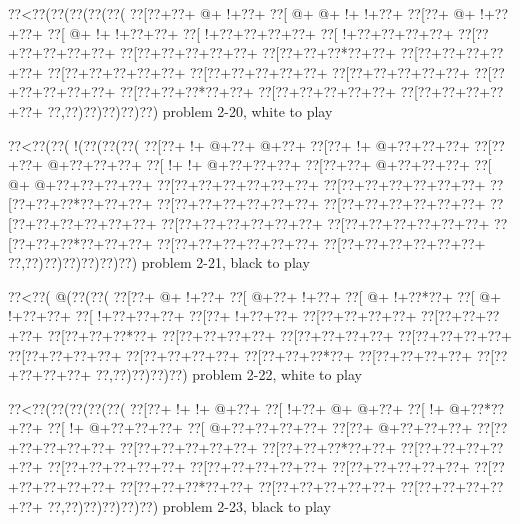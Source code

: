 \vbox{\vbox{\goo
\0??<\0??(\0??(\0??(\0??(\0??(
\0??[\0??+\0??+\- @+\- !+\0??+
\0??[\- @+\- @+\- !+\- !+\0??+
\0??[\0??+\- @+\- !+\0??+\0??+
\0??[\- @+\- !+\- !+\0??+\0??+
\0??[\- !+\0??+\0??+\0??+\0??+
\0??[\- !+\0??+\0??+\0??+\0??+
\0??[\0??+\0??+\0??+\0??+\0??+
\0??[\0??+\0??+\0??+\0??+\0??+
\0??[\0??+\0??+\0??*\0??+\0??+
\0??[\0??+\0??+\0??+\0??+\0??+
\0??[\0??+\0??+\0??+\0??+\0??+
\0??[\0??+\0??+\0??+\0??+\0??+
\0??[\0??+\0??+\0??+\0??+\0??+
\0??[\0??+\0??+\0??+\0??+\0??+
\0??[\0??+\0??+\0??*\0??+\0??+
\0??[\0??+\0??+\0??+\0??+\0??+
\0??[\0??+\0??+\0??+\0??+\0??+
\0??,\0??)\0??)\0??)\0??)\0??)
}
\hfil problem 2-20, white to play\hfil\break
}

\vbox{\vbox{\goo
\0??<\0??(\0??(\- !(\0??(\0??(\0??(
\0??[\0??+\- !+\- @+\0??+\- @+\0??+
\0??[\0??+\- !+\- @+\0??+\0??+\0??+
\0??[\0??+\0??+\- @+\0??+\0??+\0??+
\0??[\- !+\- !+\- @+\0??+\0??+\0??+
\0??[\0??+\0??+\- @+\0??+\0??+\0??+
\0??[\- @+\- @+\0??+\0??+\0??+\0??+
\0??[\0??+\0??+\0??+\0??+\0??+\0??+
\0??[\0??+\0??+\0??+\0??+\0??+\0??+
\0??[\0??+\0??+\0??*\0??+\0??+\0??+
\0??[\0??+\0??+\0??+\0??+\0??+\0??+
\0??[\0??+\0??+\0??+\0??+\0??+\0??+
\0??[\0??+\0??+\0??+\0??+\0??+\0??+
\0??[\0??+\0??+\0??+\0??+\0??+\0??+
\0??[\0??+\0??+\0??+\0??+\0??+\0??+
\0??[\0??+\0??+\0??*\0??+\0??+\0??+
\0??[\0??+\0??+\0??+\0??+\0??+\0??+
\0??[\0??+\0??+\0??+\0??+\0??+\0??+
\0??,\0??)\0??)\0??)\0??)\0??)\0??)
}
\hfil problem 2-21, black to play\hfil\break
}

\vbox{\vbox{\goo
\0??<\0??(\- @(\0??(\0??(
\0??[\0??+\- @+\- !+\0??+
\0??[\- @+\0??+\- !+\0??+
\0??[\- @+\- !+\0??*\0??+
\0??[\- @+\- !+\0??+\0??+
\0??[\- !+\0??+\0??+\0??+
\0??[\0??+\- !+\0??+\0??+
\0??[\0??+\0??+\0??+\0??+
\0??[\0??+\0??+\0??+\0??+
\0??[\0??+\0??+\0??*\0??+
\0??[\0??+\0??+\0??+\0??+
\0??[\0??+\0??+\0??+\0??+
\0??[\0??+\0??+\0??+\0??+
\0??[\0??+\0??+\0??+\0??+
\0??[\0??+\0??+\0??+\0??+
\0??[\0??+\0??+\0??*\0??+
\0??[\0??+\0??+\0??+\0??+
\0??[\0??+\0??+\0??+\0??+
\0??,\0??)\0??)\0??)\0??)
}
\hfil problem 2-22, white to play\hfil\break
}

\vbox{\vbox{\goo
\0??<\0??(\0??(\0??(\0??(\0??(
\0??[\0??+\- !+\- !+\- @+\0??+
\0??[\- !+\0??+\- @+\- @+\0??+
\0??[\- !+\- @+\0??*\0??+\0??+
\0??[\- !+\- @+\0??+\0??+\0??+
\0??[\- @+\0??+\0??+\0??+\0??+
\0??[\0??+\- @+\0??+\0??+\0??+
\0??[\0??+\0??+\0??+\0??+\0??+
\0??[\0??+\0??+\0??+\0??+\0??+
\0??[\0??+\0??+\0??*\0??+\0??+
\0??[\0??+\0??+\0??+\0??+\0??+
\0??[\0??+\0??+\0??+\0??+\0??+
\0??[\0??+\0??+\0??+\0??+\0??+
\0??[\0??+\0??+\0??+\0??+\0??+
\0??[\0??+\0??+\0??+\0??+\0??+
\0??[\0??+\0??+\0??*\0??+\0??+
\0??[\0??+\0??+\0??+\0??+\0??+
\0??[\0??+\0??+\0??+\0??+\0??+
\0??,\0??)\0??)\0??)\0??)\0??)
}
\hfil problem 2-23, black to play\hfil\break
}

